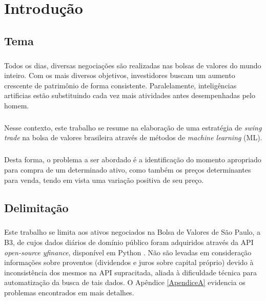 \chapter{Introdução}
\label{cap1}



\FloatBarrier
\section{Tema}

\paragraph{} Todos os dias, diversas negociações são realizadas nas bolsas de valores do mundo inteiro. Com os mais diversos objetivos, investidores buscam um aumento crescente de patrimônio de forma consistente. Paralelamente, inteligências artificias estão substituindo cada vez mais atividades antes desempenhadas pelo homem.

\paragraph{} Nesse contexto, este trabalho se resume na elaboração de uma estratégia de \textit{swing trade} \cite{velez2012swing} na bolsa de valores brasileira através de métodos de \textit{machine learning} (ML).

\paragraph{} Desta forma, o problema a ser abordado é a identificação do momento apropriado para compra de um determinado ativo, como também os preços determinantes para venda, tendo em vista uma variação positiva de seu preço.



\FloatBarrier
\section{Delimitação}

\paragraph{} Este trabalho se limita aos ativos negociados na Bolsa de Valores de São Paulo, a B3, de cujos dados diários de domínio público foram adquiridos através da API \textit{open-source yfinance}, disponível em Python \cite{python}. Não são levadas em consideração informações sobre proventos (dividendos e juros sobre capital próprio) devido à inconsistência dos mesmos na API supracitada, aliada à dificuldade técnica para automatização da busca de tais dados. O Apêndice \ref{ApendiceA} evidencia os problemas encontrados em mais detalhes.

